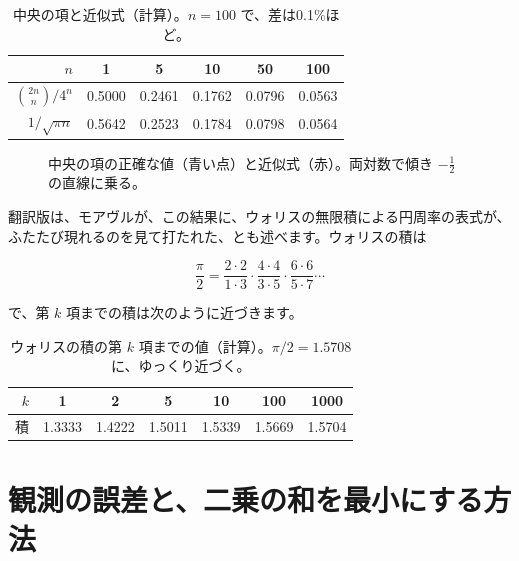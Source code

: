 \documentclass[a4paper,11pt,openany]{ltjsbook}
\begin{document}
\begin{table}[htbp]
\centering
\begin{tabular}{r|ccccc}
\toprule
$n$ & 1 & 5 & 10 & 50 & 100\\
\midrule
$\binom{2n}{n}/4^n$ & 0.5000 & 0.2461 & 0.1762 & 0.0796 & 0.0563\\
$1/\sqrt{\pi n}$ & 0.5642 & 0.2523 & 0.1784 & 0.0798 & 0.0564\\
\bottomrule
\end{tabular}
\caption{中央の項と近似式（計算）。$n=100$ で、差は0.1\%ほど。}
\end{table}

\begin{figure}[htbp]
\centering
{}
\caption{中央の項の正確な値（青い点）と近似式（赤）。両対数で傾き $-\tfrac12$ の直線に乗る。}
\end{figure}

翻訳版は、モアヴルが、この結果に、ウォリスの無限積による円周率の表式が、ふたたび現れるのを見て打たれた、とも述べます。ウォリスの積は

\[
\frac\pi2=\frac{2\cdot2}{1\cdot3}\cdot\frac{4\cdot4}{3\cdot5}\cdot\frac{6\cdot6}{5\cdot7}\cdots
\]

で、第 $k$ 項までの積は次のように近づきます。

\begin{table}[htbp]
\centering
\begin{tabular}{r|cccccc}
\toprule
$k$ & 1 & 2 & 5 & 10 & 100 & 1000\\
\midrule
積 & 1.3333 & 1.4222 & 1.5011 & 1.5339 & 1.5669 & 1.5704\\
\bottomrule
\end{tabular}
\caption{ウォリスの積の第 $k$ 項までの値（計算）。$\pi/2=1.5708$ に、ゆっくり近づく。}
\end{table}

\section{観測の誤差と、二乗の和を最小にする方法}
\end{document}
